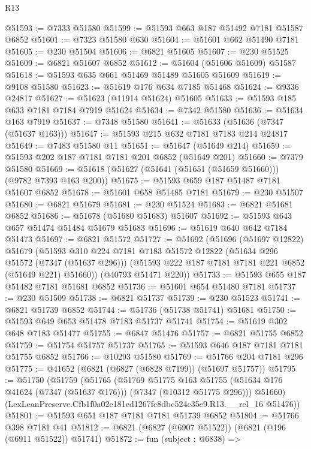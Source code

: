 \begin{lexlean}{R13}
\begin{coremodule}
@51593 := @7333 @51580
@51599 := @51593 @663 @187 @51492 @7181 @51587 @6852
@51601 := @7323 @51580 @630
@51604 := @51601 @662 @51490 @7181
@51605 := @230 @51504
@51606 := @6821 @51605
@51607 := @230 @51525
@51609 := @6821 @51607 @6852
@51612 := @51604 (@51606 @51609) @51587
@51618 := @51593 @635 @661 @51469 @51489 @51605 @51609
@51619 := @9108 @51580
@51623 := @51619 @176 @634 @7185 @51468
@51624 := @9336 @24817
@51627 := @51623 (@11914 @51624) @51605
@51633 := @51593 @185 @633 @7181 @7184 @7919 @51624
@51634 := @7342 @51580
@51636 := @51634 @163 @7919
@51637 := @7348 @51580
@51641 := @51633 (@51636 (@7347 (@51637 @163)))
@51647 := @51593 @215 @632 @7181 @7183 @214 @24817
@51649 := @7483 @51580 @11
@51651 := @51647 (@51649 @214)
@51659 := @51593 @202 @187 @7181 @7181 @201 @6852 (@51649 @201)
@51660 := @7379 @51580
@51669 := @51618 (@51627 (@51641 (@51651 (@51659 @51660))) (@9782 @7393 @163 @200))
@51675 := @51593 @659 @187 @51487 @7181 @51607 @6852
@51678 := @51601 @658 @51485 @7181
@51679 := @230 @51507
@51680 := @6821 @51679
@51681 := @230 @51524
@51683 := @6821 @51681 @6852
@51686 := @51678 (@51680 @51683) @51607
@51692 := @51593 @643 @657 @51474 @51484 @51679 @51683
@51696 := @51619 @640 @642 @7184 @51473
@51697 := @6821 @51572
@51727 := @51692
    (@51696
      (@51697 @12822)
      @51679
      (@51593
        @310
        @224
        @7181
        @7183
        @51572
        @12822
        (@51634 @296 @51572 (@7347 (@51637 @296)))
        (@51593 @222 @187 @7181 @7181 @221 @6852 (@51649 @221) @51660))
      (@40793 @51471 @220))
@51733 := @51593 @655 @187 @51482 @7181 @51681 @6852
@51736 := @51601 @654 @51480 @7181
@51737 := @230 @51509
@51738 := @6821 @51737
@51739 := @230 @51523
@51741 := @6821 @51739 @6852
@51744 := @51736 (@51738 @51741) @51681
@51750 := @51593 @649 @653 @51478 @7183 @51737 @51741
@51754 := @51619 @302 @648 @7183 @51477
@51755 := @6847 @51476
@51757 := @6821 @51755 @6852
@51759 := @51754 @51757 @51737
@51765 := @51593 @646 @187 @7181 @7181 @51755 @6852
@51766 := @10293 @51580
@51769 := @51766 @204 @7181 @296
@51775 := @41652 (@6821 (@6827 (@6828 @7199)) (@51697 @51757))
@51795 := @51750
    (@51759
      (@51765
        (@51769
          @51775
          @163
          @51755
          (@51634 @176 @41624 (@7347 (@51637 @176)))
          (@7347 (@10312 @51775 @296)))
        @51660)
      (LexLeanPreserve.Cfb1f0a02e181ed1267fc8dbc524c35e9.R13.__rel_16 @51476))
@51801 := @51593 @651 @187 @7181 @7181 @51739 @6852
@51804 := @51766 @398 @7181 @41
@51812 := @6821 (@6827 (@6907 @51522)) (@6821 (@196 (@6911 @51522)) @51741)
@51872 := fun (subject : @6838) =>

\end{coremodule}
\end{lexlean}
